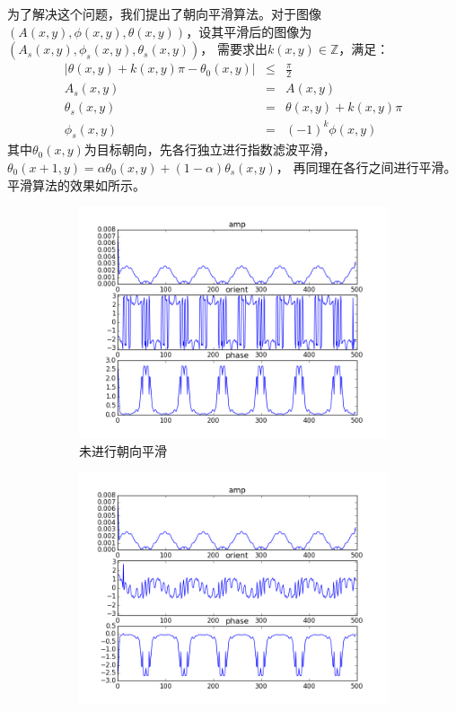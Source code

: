 为了解决这个问题，我们提出了朝向平滑算法。对于图像$(A(x, y), \phi(x, y),
\theta(x, y))$，设其平滑后的图像为$(A_s(x, y), \phi_s(x, y), \theta_s(x, y))$，
需要求出$k(x, y)\in \mathbb{Z}$，满足：
\begin{eqnarray}
    |\theta(x, y) + k(x, y)\pi - \theta_0(x, y)| &\le& \frac{\pi}{2} \nonumber \\
    A_s(x, y) &=& A(x, y) \nonumber \\
    \theta_s(x, y) &=& \theta(x, y) + k(x, y)\pi \nonumber \\
    \phi_s(x, y) &=& (-1)^k\phi(x, y)
\end{eqnarray}
其中$\theta_0(x, y)$为目标朝向，先各行独立进行指数滤波平滑，
$\theta_0(x+1, y) = \alpha\theta_0(x, y) + (1-\alpha)\theta_s(x, y)$，
再同理在各行之间进行平滑。平滑算法的效果如所示。
\begin{figure}[tb]\begin{center}
    \begin{subfigure}[b]{.5\figwidth}
        \centering
        \includegraphics[width=.5\figwidth]{res/smooth-0.png}
        \caption{未进行朝向平滑}
    \end{subfigure}
    \begin{subfigure}[b]{.5\figwidth}
        \centering
        \includegraphics[width=.5\figwidth]{res/smooth-1.png}

\end{subfigure}
\end{center}
\end{figure}
